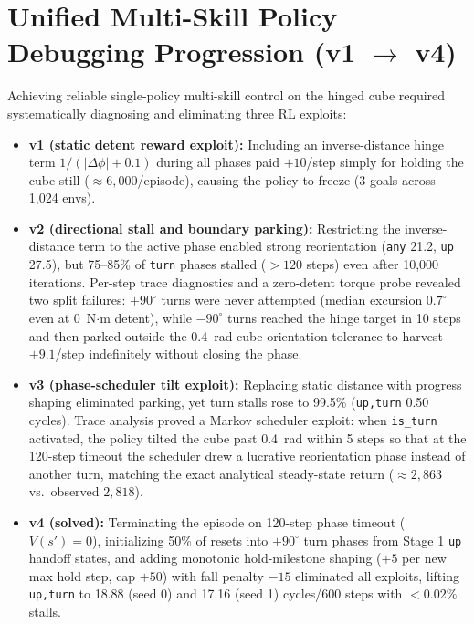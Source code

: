 \section{Unified Multi-Skill Policy Debugging Progression (v1 $\to$ v4)}
\label{app:unified_debug}
Achieving reliable single-policy multi-skill control on the hinged cube required systematically diagnosing and eliminating three RL exploits:
\begin{itemize}[leftmargin=1.5em,itemsep=2pt]
  \item \textbf{v1 (static detent reward exploit):} Including an inverse-distance hinge term $1/(|\Delta\phi|+0.1)$ during all phases paid $+10$/step simply for holding the cube still ($\approx 6,000$/episode), causing the policy to freeze (3 goals across 1,024 envs).
  \item \textbf{v2 (directional stall and boundary parking):} Restricting the inverse-distance term to the active phase enabled strong reorientation (\texttt{any} 21.2, \texttt{up} 27.5), but 75--85\% of \texttt{turn} phases stalled ($>120$ steps) even after 10,000 iterations. Per-step trace diagnostics and a zero-detent torque probe revealed two split failures: $+90^\circ$ turns were never attempted (median excursion $0.7^\circ$ even at 0~N$\cdot$m detent), while $-90^\circ$ turns reached the hinge target in 10 steps and then parked outside the 0.4~rad cube-orientation tolerance to harvest $+9.1$/step indefinitely without closing the phase.
  \item \textbf{v3 (phase-scheduler tilt exploit):} Replacing static distance with progress shaping eliminated parking, yet turn stalls rose to 99.5\% (\texttt{up,turn} 0.50 cycles). Trace analysis proved a Markov scheduler exploit: when \texttt{is\_turn} activated, the policy tilted the cube past 0.4~rad within 5 steps so that at the 120-step timeout the scheduler drew a lucrative reorientation phase instead of another turn, matching the exact analytical steady-state return ($\approx 2,863$ vs.\ observed $2,818$).
  \item \textbf{v4 (solved):} Terminating the episode on 120-step phase timeout ($V(s')=0$), initializing 50\% of resets into $\pm 90^\circ$ turn phases from Stage 1 \texttt{up} handoff states, and adding monotonic hold-milestone shaping ($+5$ per new max hold step, cap $+50$) with fall penalty $-15$ eliminated all exploits, lifting \texttt{up,turn} to 18.88 (seed 0) and 17.16 (seed 1) cycles/600 steps with $<0.02\%$ stalls.
\end{itemize}

